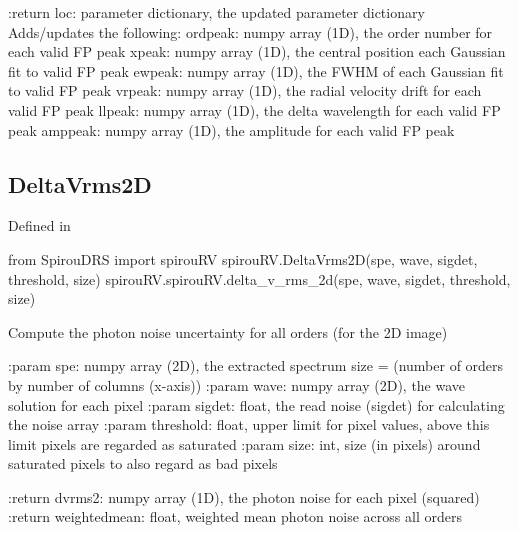 \begin{minipage}{\textwidth}
\begin{pythondocstring}
:return loc: parameter dictionary, the updated parameter dictionary
        Adds/updates the following:
            ordpeak: numpy array (1D), the order number for each valid FP
                     peak
            xpeak: numpy array (1D), the central position each Gaussian fit
                   to valid FP peak
            ewpeak: numpy array (1D), the FWHM of each Gaussian fit
                    to valid FP peak
            vrpeak: numpy array (1D), the radial velocity drift for each
                    valid FP peak
            llpeak: numpy array (1D), the delta wavelength for each valid
                    FP peak
            amppeak: numpy array (1D), the amplitude for each valid FP peak
\end{pythondocstring}
\end{minipage}

\noindent\begin{minipage}{\textwidth}
\subsection{DeltaVrms2D}

Defined in \spirouRV{}

\begin{pythonbox}
from SpirouDRS import spirouRV
spirouRV.DeltaVrms2D(spe, wave, sigdet, threshold, size)
spirouRV.spirouRV.delta_v_rms_2d(spe, wave, sigdet, threshold, size)
\end{pythonbox}

\begin{pythondocstring}
Compute the photon noise uncertainty for all orders (for the 2D image)

:param spe: numpy array (2D), the extracted spectrum
            size = (number of orders by number of columns (x-axis))
:param wave: numpy array (2D), the wave solution for each pixel
:param sigdet: float, the read noise (sigdet) for calculating the
               noise array
:param threshold: float, upper limit for pixel values, above this limit
                  pixels are regarded as saturated
:param size: int, size (in pixels) around saturated pixels to also regard
             as bad pixels

:return dvrms2: numpy array (1D), the photon noise for each pixel (squared)
:return weightedmean: float, weighted mean photon noise across all orders
\end{pythondocstring}
\end{minipage}

